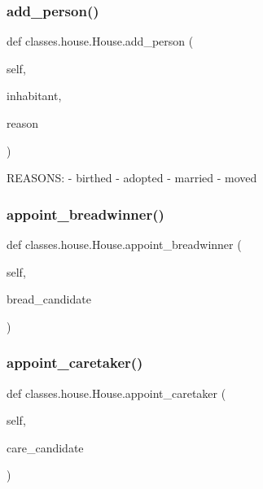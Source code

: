\subsubsection{\texorpdfstring{add\+\_\+person()}{add\_person()}}
{\footnotesize\ttfamily def classes.\+house.\+House.\+add\+\_\+person (\begin{DoxyParamCaption}\item[{}]{self,  }\item[{}]{inhabitant,  }\item[{}]{reason }\end{DoxyParamCaption})}

\begin{DoxyVerb}REASONS:
- birthed
- adopted
- married
- moved
\end{DoxyVerb}
 \mbox{\label{classclasses_1_1house_1_1House_ad448b07e7d817e96e3a7143c71862140}} 
\subsubsection{\texorpdfstring{appoint\+\_\+breadwinner()}{appoint\_breadwinner()}}
{\footnotesize\ttfamily def classes.\+house.\+House.\+appoint\+\_\+breadwinner (\begin{DoxyParamCaption}\item[{}]{self,  }\item[{}]{bread\+\_\+candidate }\end{DoxyParamCaption})}

\mbox{\label{classclasses_1_1house_1_1House_a9b215f18d3a5138bcc474c67313654a1}} 
\subsubsection{\texorpdfstring{appoint\+\_\+caretaker()}{appoint\_caretaker()}}
{\footnotesize\ttfamily def classes.\+house.\+House.\+appoint\+\_\+caretaker (\begin{DoxyParamCaption}\item[{}]{self,  }\item[{}]{care\+\_\+candidate }\end{DoxyParamCaption})}

